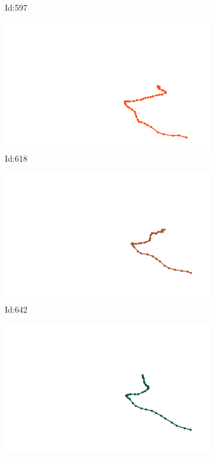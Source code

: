 \documentclass[12pt,twoside]{report}
\begin{document}
\begin{figure}
\begin{subfigure}[b]{0.20\textwidth}
\caption{Id:597}
\end{subfigure}
\begin{subfigure}[b]{0.20\textwidth}
\centering
\includegraphics[width=\textwidth]{../trajectories/618.png}
\caption{Id:618}
\end{subfigure}
\begin{subfigure}[b]{0.20\textwidth}
\centering
\includegraphics[width=\textwidth]{../trajectories/642.png}
\caption{Id:642}
\end{subfigure}
\begin{subfigure}[b]{0.20\textwidth}
\centering
\includegraphics[width=\textwidth]{../trajectories/643.png}

\end{subfigure}
\end{figure}
\end{document}
